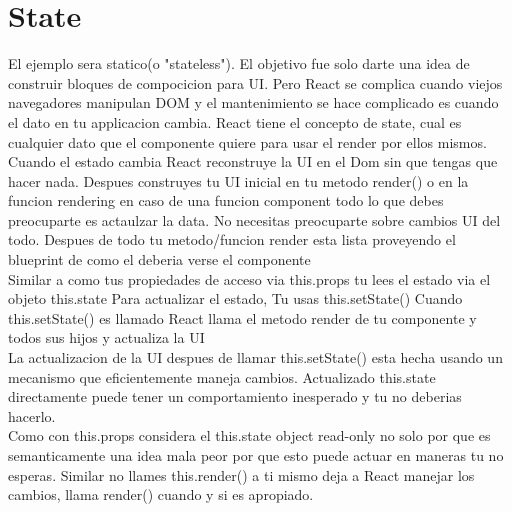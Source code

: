 \section{State}
El ejemplo sera statico(o "stateless"). El objetivo fue solo darte una idea de construir bloques de compocicion para UI. Pero React se complica cuando viejos navegadores manipulan DOM y el mantenimiento se hace complicado es cuando el dato en tu applicacion cambia. React tiene el concepto de state, cual es cualquier dato que el componente quiere para usar el render por ellos mismos.\\
Cuando el estado cambia React reconstruye la UI en el Dom sin que tengas que hacer nada. Despues construyes tu UI inicial en tu metodo render() o en la funcion rendering en caso de una funcion component todo lo que debes preocuparte es actaulzar la data. No necesitas preocuparte sobre cambios UI del todo. Despues de todo tu metodo/funcion render esta lista proveyendo el blueprint de como el deberia verse el componente\\
Similar a como tus propiedades de acceso via this.props tu lees el estado via el objeto this.state Para actualizar el estado, Tu usas this.setState() Cuando this.setState() es llamado React llama el metodo render de tu componente y todos sus hijos y actualiza la UI\\
La actualizacion de la UI despues de llamar this.setState() esta hecha usando un mecanismo que eficientemente maneja cambios. Actualizado this.state directamente puede tener un comportamiento inesperado y tu no deberias hacerlo. \\
Como con this.props considera el this.state object read-only no solo por que es semanticamente una idea mala peor por que esto puede actuar en maneras tu no esperas. Similar no llames this.render() a ti mismo deja a React manejar los cambios, llama render() cuando y si es apropiado.
